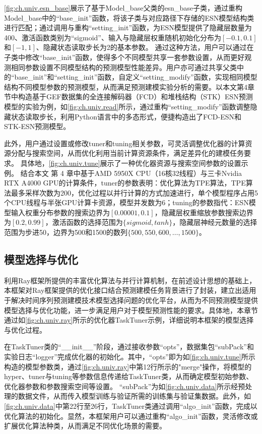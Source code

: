 \autoref{fig:ch.univ.esn_base}展示了基于Model_base父类的esn_base子类，通过重构Model_base中的“base_init”函数，将该子类与对应路径下存储的ESN模型结构类进行匹配；通过调用与重构“setting_init”函数，为ESN模型提供了隐藏层数量为400、激活函数类别为“sigmoid”、输入与隐藏层权重随机初始化分布为\([-0.1,0.1]\)和\([-1,1]\)、隐藏状态读取步长为2的基本参数。
通过这种方法，用户可以通过在子类中修改“base_init”函数，使得多个不同模型共享一套参数设置，从而更好观测相同参数设置不同模型结构的预测模型性能差异。用户亦可通过共享父类中的“base_init”和“setting_init”函数，自定义“setting_modify”函数，实现相同模型结构不同模型参数的预测模型，从而满足预测建模实验分析的需要。以本文第4章节中构造基于GEF数据集的全连接解码器（FCD）和堆栈结构（STK）ESN预测模型的实验为例，如\autoref{fig:ch.univ.read}所示，通过重构“setting_modify”函数调整隐藏状态读取步长，利用Python语言中的多态形式，便捷构造出了FCD-ESN和STK-ESN预测模型。

此外，用户通过设置或修改tuner和tuning相关参数，可灵活调整优化器的计算资源分配与搜索空间，从而优化利用当前计算资源条件，满足差异化的建模任务要求。
具体地，\autoref{fig:ch.univ.tune}展示了一种优化器资源与搜索空间参数的设置示例。
结合本文
第
4
章中基于AMD 5950X CPU（16核32线程）与三卡Nvidia RTX A4000 GPU的计算条件，tuner的参数表明：优化算法为TPE算法，TPE算法最多采样次数为200，优化过程以并行计算的方式加速进行，单个模型程序占用5个CPU线程与半张GPU计算卡资源，模型并发数为6；tuning的参数指代：ESN模型输入权重分布参数的搜索边界为\([0.00001, 0.1]\)，隐藏层权重缩放参数搜索边界为\([0.2, 0.99]\)，激活函数的选择范围为\(\{sigmoid, tanh\}\)，隐藏层神经元数量的选择范围为步进50，边界为500和1500的数列\(\{500, 550, 600, \ldots, 1500\}\)。


\subsection{模型选择与优化}
利用Ray框架所提供的丰富优化算法与并行计算机制，在前述设计思想的基础上，本框架对Ray框架提供的优化接口结合预测建模任务背景进行了封装，建立出适用于解决时间序列预测建模技术模型选择问题的优化平台，从而为不同预测模型提供模型选择与优化功能，进一步满足用户对于模型预测性能的要求。具体地，本章节通过如\autoref{fig:ch.univ.ray}所示的优化器TaskTuner示例，详细说明本框架的模型选择与优化过程。

在TaskTuner类的“__init__”阶段，通过接收参数“opts”，数据集包“subPack”和实验日志“logger”完成优化器的初始化。其中，“opts”即为如\autoref{fig:ch.univ.tune}所示构造的模型参数类，通过\autoref{fig:ch.univ.ray}中第12行所示的"merge"操作，将模型的hyper、tuner与tuning等参数信息传递给TaskTuner类，从而确定模型初始参数、优化器参数和参数搜索空间等设置。
“subPack”为如\autoref{fig:ch.univ.data}所示经预处理的数据文件，从而传入模型训练与验证所需的训练集与验证集数据。此外，如\autoref{fig:ch.univ.data}中第22行至26行，TaskTuner类通过调用“algo_init”函数，完成以优化算法的初始化。显然，本框架用户可以通过重构“algo_init”函数，灵活修改或扩展优化算法种类，从而满足不同优化场景的需要。

